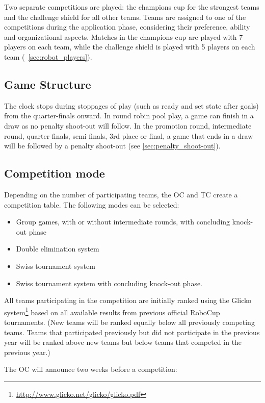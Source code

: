 Two separate competitions are played: the champions cup for the strongest teams and the challenge shield for all other teams.
Teams are assigned to one of the competitions during the application phase, considering their preference, ability and organizational aspects.
Matches in the champions cup are played with 7 players on each team, while the challenge shield is played with 5 players on each team (\cf~\cref{sec:robot_players}).

\subsection{Game Structure}

The clock stops during stoppages of play (such as ready and set state after goals) from the quarter-finals onward.  In round robin pool play, a game can finish in a draw as no penalty shoot-out will follow. In the promotion round, intermediate round, quarter finals, semi finals, 3rd place or final, a game that ends in a draw will be followed by a penalty shoot-out (see \cref{sec:penalty_shoot-out}).

\subsection{Competition mode}

Depending on the number of participating teams, the OC and TC create a competition table. The following modes can be selected:

\begin{itemize}
  \item Group games, with or without intermediate rounds, with concluding knock-out phase
  \item Double elimination system
  \item Swiss tournament system
  \item Swiss tournament system with concluding knock-out phase.
\end{itemize}

All teams participating in the competition are initially ranked using the Glicko system\footnote{\url{http://www.glicko.net/glicko/glicko.pdf}} based on all available results from previous official RoboCup tournaments. (New teams will be ranked equally below all previously competing teams. Teams that participated previously but did not participate in the previous year will be ranked above new teams but below teams that competed in the previous year.)

The OC will announce two weeks before a competition:


